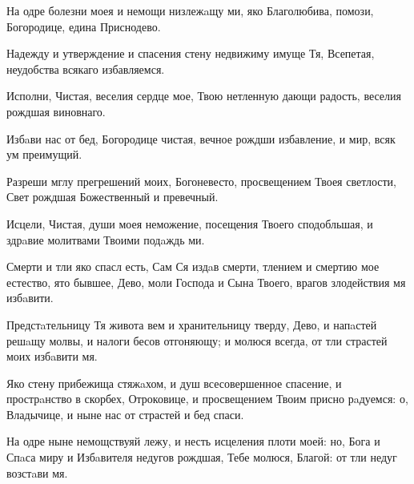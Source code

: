 \begin{mymulticols}
\slava

На одре болезни моея и немощи низлежaщу ми, яко Благолюбива, помози, Богородице, едина Приснодево.

\inyne

Надежду и утверждение и спасения стену недвижиму имуще Тя, Всепетая, неудобства всякаго избавляемся.




Исполни, Чистая, веселия сердце мое, Твою нетленную дающи радость, веселия рождшая виновнаго.


Избaви нас от бед, Богородице чистая, вечное рождши избавление, и мир, всяк ум преимущий.

\slava

Разреши мглу прегрешений моих, Богоневесто, просвещением Твоея светлости, Свет рождшая Божественный и превечный.

\inyne

Исцели, Чистая, души моея неможение, посещения Твоего сподобльшая, и здрaвие молитвами Твоими подaждь ми.




Смерти и тли яко спасл есть, Сам Ся издaв смерти, тлением и смертию мое естество, ято бывшее, Дево, моли Господа и Сына Твоего, врагов злодействия мя избaвити.


Предстaтельницу Тя живота вем и хранительницу тверду, Дево, и напaстей решaщу молвы, и налоги бесов отгоняющу; и молюся всегда, от тли страстей моих избaвити мя.

\slava

Яко стену прибежища стяжaхом, и душ всесовершенное спасение, и прострaнство в скорбех, Отроковице, и просвещением Твоим присно рaдуемся: о, Владычице, и ныне нас от страстей и бед спаси.

\inyne

На одре ныне немощствуяй лежу, и несть исцеления плоти моей: но, Бога и Спaса миру и Избaвителя недугов рождшая, Тебе молюся, Благой: от тли недуг возстaви мя.


\end{mymulticols}
